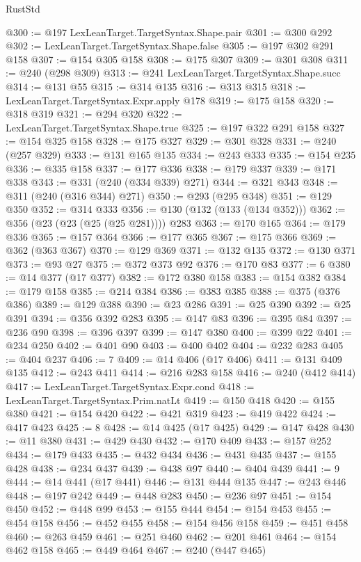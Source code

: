 \begin{lexlean}{RustStd}
\begin{coremodule}
{\begin{coremodule}
{{{{{{{{{{{{{{{{{{{{{{{{{{{{{{{{{{{{{{{@300 := @197 LexLeanTarget.TargetSyntax.Shape.pair
@301 := @300 @292
@302 := LexLeanTarget.TargetSyntax.Shape.false
@305 := @197 @302 @291 @158
@307 := @154 @305 @158
@308 := @175 @307
@309 := @301 @308
@311 := @240 (@298 @309)
@313 := @241 LexLeanTarget.TargetSyntax.Shape.succ
@314 := @131 @55
@315 := @314 @135
@316 := @313 @315
@318 := LexLeanTarget.TargetSyntax.Expr.apply @178
@319 := @175 @158
@320 := @318 @319
@321 := @294 @320
@322 := LexLeanTarget.TargetSyntax.Shape.true
@325 := @197 @322 @291 @158
@327 := @154 @325 @158
@328 := @175 @327
@329 := @301 @328
@331 := @240 (@257 @329)
@333 := @131 @165 @135
@334 := @243 @333
@335 := @154 @235
@336 := @335 @158
@337 := @177 @336
@338 := @179 @337
@339 := @171 @338
@343 := @331 (@240 (@334 @339) @271)
@344 := @321 @343
@348 := @311 (@240 (@316 @344) @271)
@350 := @293 (@295 @348)
@351 := @129 @350
@352 := @314 @333
@356 := @130 (@132 (@133 (@134 @352)))
@362 := @356 (@23 (@23 (@25 (@25 @281)))) @283
@363 := @170 @165
@364 := @179 @336
@365 := @157 @364
@366 := @177 @365
@367 := @175 @366
@369 := @362 (@363 @367)
@370 := @129 @369
@371 := @132 @135
@372 := @130 @371
@373 := @93 @27
@375 := @372 @373 @92
@376 := @170 @83
@377 := 6
@380 := @14 @377 (@17 @377)
@382 := @172 @380 @158
@383 := @154 @382
@384 := @179 @158
@385 := @214 @384
@386 := @383 @385
@388 := @375 (@376 @386)
@389 := @129 @388
@390 := @23 @286
@391 := @25 @390
@392 := @25 @391
@394 := @356 @392 @283
@395 := @147 @83
@396 := @395 @84
@397 := @236 @90
@398 := @396 @397
@399 := @147 @380
@400 := @399 @22
@401 := @234 @250
@402 := @401 @90
@403 := @400 @402
@404 := @232 @283
@405 := @404 @237
@406 := 7
@409 := @14 @406 (@17 @406)
@411 := @131 @409 @135
@412 := @243 @411
@414 := @216 @283 @158
@416 := @240 (@412 @414)
@417 := LexLeanTarget.TargetSyntax.Expr.cond
@418 := LexLeanTarget.TargetSyntax.Prim.natLt
@419 := @150 @418
@420 := @155 @380
@421 := @154 @420
@422 := @421 @319
@423 := @419 @422
@424 := @417 @423
@425 := 8
@428 := @14 @425 (@17 @425)
@429 := @147 @428
@430 := @11 @380
@431 := @429 @430
@432 := @170 @409
@433 := @157 @252
@434 := @179 @433
@435 := @432 @434
@436 := @431 @435
@437 := @155 @428
@438 := @234 @437
@439 := @438 @97
@440 := @404 @439
@441 := 9
@444 := @14 @441 (@17 @441)
@446 := @131 @444 @135
@447 := @243 @446
@448 := @197 @242
@449 := @448 @283
@450 := @236 @97
@451 := @154 @450
@452 := @448 @99
@453 := @155 @444
@454 := @154 @453
@455 := @454 @158
@456 := @452 @455
@458 := @154 @456 @158
@459 := @451 @458
@460 := @263 @459
@461 := @251 @460
@462 := @201 @461
@464 := @154 @462 @158
@465 := @449 @464
@467 := @240 (@447 @465)
}}}}}}}}}}}}}}}}}}}}}}}}}}}}}}}}}}}}}}}
\end{coremodule}}
\end{coremodule}
\end{lexlean}
